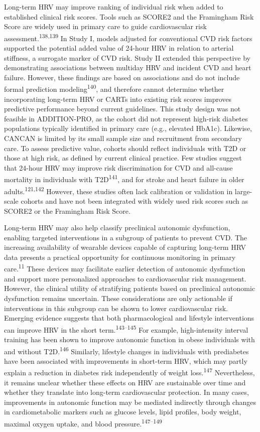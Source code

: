 \documentclass[
  a4paper,
  headsepline=true,
  open=left]{scrbook}
\begin{document}
Long-term HRV may improve ranking of individual risk when added to
established clinical risk scores. Tools such as SCORE2 and the
Framingham Risk Score are widely used in primary care to guide
cardiovascular risk assessment.\textsuperscript{138,139} In Study I,
models adjusted for conventional CVD risk factors supported the
potential added value of 24-hour HRV in relation to arterial stiffness,
a surrogate marker of CVD risk. Study II extended this perspective by
demonstrating associations between multiday HRV and incident CVD and
heart failure. However, these findings are based on associations and do
not include formal prediction modeling\textsuperscript{140}, and
therefore cannot determine whether incorporating long-term HRV or CARTs
into existing risk scores improves predictive performance beyond current
guidelines. This study design was not feasible in ADDITION-PRO, as the
cohort did not represent high-risk diabetes populations typically
identified in primary care (e.g., elevated HbA1c). Likewise, CANCAN is
limited by its small sample size and recruitment from secondary care. To
assess predictive value, cohorts should reflect individuals with T2D or
those at high risk, as defined by current clinical practice. Few studies
suggest that 24-hour HRV may improve risk discrimination for CVD and
all-cause mortality in individuals with T2D\textsuperscript{141}, and
for stroke and heart failure in older adults.\textsuperscript{121,142}
However, these studies often lack calibration or validation in
large-scale cohorts and have not been integrated with widely used risk
scores such as SCORE2 or the Framingham Risk Score.

Long-term HRV may also help classify preclinical autonomic dysfunction,
enabling targeted interventions in a subgroup of patients to prevent
CVD. The increasing availability of wearable devices capable of
capturing long-term HRV data presents a practical opportunity for
continuous monitoring in primary care.\textsuperscript{11} These devices
may facilitate earlier detection of autonomic dysfunction and support
more personalized approaches to cardiovascular risk management. However,
the clinical utility of stratifying patients based on preclinical
autonomic dysfunction remains uncertain. These considerations are only
actionable if interventions in this subgroup can be shown to lower
cardiovascular risk. Emerging evidence suggests that both
pharmacological and lifestyle interventions can improve HRV in the short
term.\textsuperscript{143--145} For example, high-intensity interval
training has been shown to improve autonomic function in obese
individuals with and without T2D.\textsuperscript{146} Similarly,
lifestyle changes in individuals with prediabetes have been associated
with improvements in short-term HRV, which may partly explain a
reduction in diabetes risk independently of weight
loss.\textsuperscript{147} Nevertheless, it remains unclear whether
these effects on HRV are sustainable over time and whether they
translate into long-term cardiovascular protection. In many cases,
improvements in autonomic function may be mediated indirectly through
changes in cardiometabolic markers such as glucose levels, lipid
profiles, body weight, maximal oxygen uptake, and blood
pressure.\textsuperscript{147--149}
\end{document}
